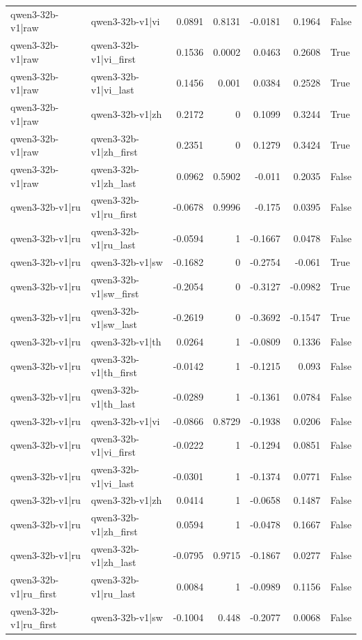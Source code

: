 \begin{table}
\begin{tabular}{l l r r r r l}
qwen3-32b-v1|raw & qwen3-32b-v1|vi & 0.0891 & 0.8131 & -0.0181 & 0.1964 & False \\
qwen3-32b-v1|raw & qwen3-32b-v1|vi_first & 0.1536 & 0.0002 & 0.0463 & 0.2608 & True \\
qwen3-32b-v1|raw & qwen3-32b-v1|vi_last & 0.1456 & 0.001 & 0.0384 & 0.2528 & True \\
qwen3-32b-v1|raw & qwen3-32b-v1|zh & 0.2172 & 0 & 0.1099 & 0.3244 & True \\
qwen3-32b-v1|raw & qwen3-32b-v1|zh_first & 0.2351 & 0 & 0.1279 & 0.3424 & True \\
qwen3-32b-v1|raw & qwen3-32b-v1|zh_last & 0.0962 & 0.5902 & -0.011 & 0.2035 & False \\
qwen3-32b-v1|ru & qwen3-32b-v1|ru_first & -0.0678 & 0.9996 & -0.175 & 0.0395 & False \\
qwen3-32b-v1|ru & qwen3-32b-v1|ru_last & -0.0594 & 1 & -0.1667 & 0.0478 & False \\
qwen3-32b-v1|ru & qwen3-32b-v1|sw & -0.1682 & 0 & -0.2754 & -0.061 & True \\
qwen3-32b-v1|ru & qwen3-32b-v1|sw_first & -0.2054 & 0 & -0.3127 & -0.0982 & True \\
qwen3-32b-v1|ru & qwen3-32b-v1|sw_last & -0.2619 & 0 & -0.3692 & -0.1547 & True \\
qwen3-32b-v1|ru & qwen3-32b-v1|th & 0.0264 & 1 & -0.0809 & 0.1336 & False \\
qwen3-32b-v1|ru & qwen3-32b-v1|th_first & -0.0142 & 1 & -0.1215 & 0.093 & False \\
qwen3-32b-v1|ru & qwen3-32b-v1|th_last & -0.0289 & 1 & -0.1361 & 0.0784 & False \\
qwen3-32b-v1|ru & qwen3-32b-v1|vi & -0.0866 & 0.8729 & -0.1938 & 0.0206 & False \\
qwen3-32b-v1|ru & qwen3-32b-v1|vi_first & -0.0222 & 1 & -0.1294 & 0.0851 & False \\
qwen3-32b-v1|ru & qwen3-32b-v1|vi_last & -0.0301 & 1 & -0.1374 & 0.0771 & False \\
qwen3-32b-v1|ru & qwen3-32b-v1|zh & 0.0414 & 1 & -0.0658 & 0.1487 & False \\
qwen3-32b-v1|ru & qwen3-32b-v1|zh_first & 0.0594 & 1 & -0.0478 & 0.1667 & False \\
qwen3-32b-v1|ru & qwen3-32b-v1|zh_last & -0.0795 & 0.9715 & -0.1867 & 0.0277 & False \\
qwen3-32b-v1|ru_first & qwen3-32b-v1|ru_last & 0.0084 & 1 & -0.0989 & 0.1156 & False \\
qwen3-32b-v1|ru_first & qwen3-32b-v1|sw & -0.1004 & 0.448 & -0.2077 & 0.0068 & False \\

\end{tabular}
\end{table}

